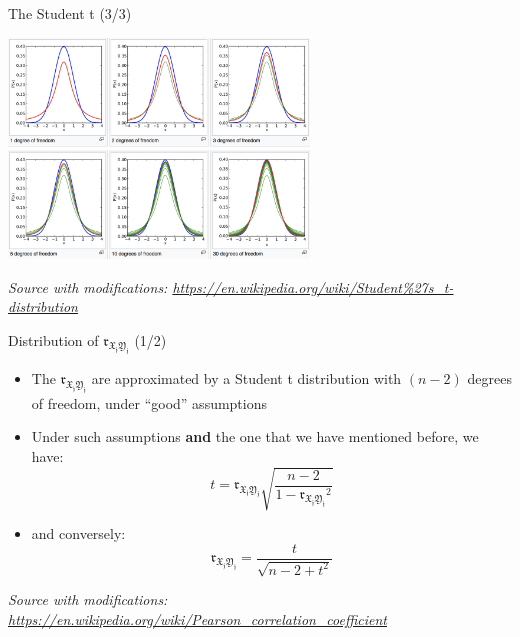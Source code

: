 \documentclass{beamer}
\begin{document}
\begin{frame}
{\centerline{The Student t (3/3)}}\label{S:GraphT}

\begin{center}
\includegraphics[width=8cm]{P2023.AIBCCSS.InferenceAndLogisticRegression/FromWikipedia_VariousTDistributions.png}
\end{center} 
\textit{\tiny
\vspace{-\baselineskip}
Source with modifications: \url{https://en.wikipedia.org/wiki/Student\%27s_t-distribution}}

\end{frame}


\begin{frame}
{\centerline{Distribution of $\mathfrak{r_{X_jY_j}}$ (1/2) }}

\begin{itemize}
\item The $\mathfrak{r_{X_jY_j}}$ are approximated by a Student t distribution with $(n-2)$ degrees of freedom, under ``good'' assumptions
\item Under such assumptions \textbf{and} the one that we have mentioned before, we have:
$$t = \mathfrak{r_{X_jY_j}}\sqrt{\frac{n-2}{1-\mathfrak{r_{X_jY_j}}^2}}$$
\item and conversely:
$$ \mathfrak{r_{X_jY_j}} = \frac{t}{\sqrt{n - 2 + t^2}}$$
\end{itemize}

\textit{\tiny
\vspace{-\baselineskip}
Source with modifications: \url{https://en.wikipedia.org/wiki/Pearson_correlation_coefficient}}
\end{frame}
\end{document}
